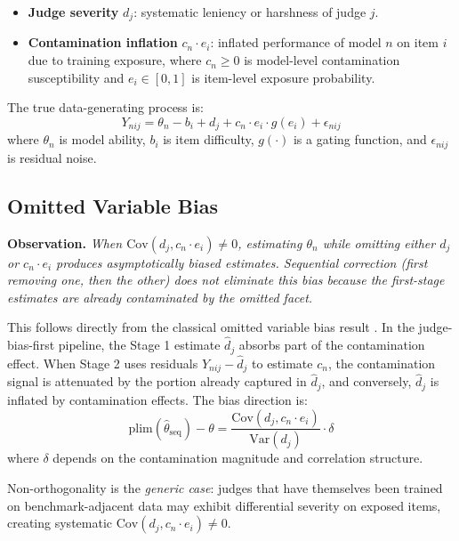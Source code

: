 \documentclass[11pt]{article}
\newcommand{\cn}{c_n}
\newcommand{\ei}{e_i}
\renewcommand{\dj}{d_j}
\begin{document}
\begin{itemize}[leftmargin=*,itemsep=1pt]
\item \textbf{Judge severity} $\dj$: systematic leniency or harshness of judge $j$.
\item \textbf{Contamination inflation} $\cn \cdot \ei$: inflated performance of model $n$ on item $i$ due to training exposure, where $\cn \geq 0$ is model-level contamination susceptibility and $\ei \in [0,1]$ is item-level exposure probability.
\end{itemize}

The true data-generating process is:
\begin{equation}
Y_{nij} = \theta_n - b_i + \dj + \cn \cdot \ei \cdot g(\ei) + \epsilon_{nij}
\label{eq:dgp}
\end{equation}
where $\theta_n$ is model ability, $b_i$ is item difficulty, $g(\cdot)$ is a gating function, and $\epsilon_{nij}$ is residual noise.

\subsection{Omitted Variable Bias}

\textbf{Observation.} \emph{When $\text{Cov}(\dj, \cn \cdot \ei) \neq 0$, estimating $\theta_n$ while omitting either $\dj$ or $\cn \cdot \ei$ produces asymptotically biased estimates. Sequential correction (first removing one, then the other) does not eliminate this bias because the first-stage estimates are already contaminated by the omitted facet.}

This follows directly from the classical omitted variable bias result \citep{angrist2009mostly}. In the judge-bias-first pipeline, the Stage 1 estimate $\hat{d}_j$ absorbs part of the contamination effect. When Stage 2 uses residuals $Y_{nij} - \hat{d}_j$ to estimate $\cn$, the contamination signal is attenuated by the portion already captured in $\hat{d}_j$, and conversely, $\hat{d}_j$ is inflated by contamination effects. The bias direction is:
\begin{equation}
\text{plim}(\hat{\theta}_{\text{seq}}) - \theta = \frac{\text{Cov}(\dj, \cn \cdot \ei)}{\text{Var}(\dj)} \cdot \delta
\end{equation}
where $\delta$ depends on the contamination magnitude and correlation structure.

Non-orthogonality is the \emph{generic case}: judges that have themselves been trained on benchmark-adjacent data may exhibit differential severity on exposed items, creating systematic $\text{Cov}(\dj, \cn \cdot \ei) \neq 0$.
\end{document}
